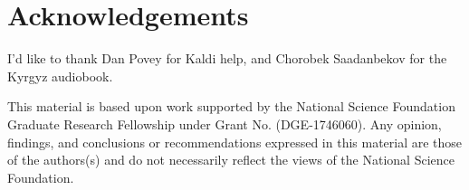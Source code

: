 \documentclass[a4paper]{article}
\begin{document}
\section{Acknowledgements}

I'd like to thank Dan Povey for Kaldi help, and Chorobek Saadanbekov for the Kyrgyz audiobook.

This material is based upon work supported by the National Science Foundation Graduate Research Fellowship under Grant No. (DGE-1746060). Any opinion, findings, and conclusions or recommendations expressed in this material are those of the authors(s) and do not necessarily reflect the views of the National Science Foundation.





\newpage



\end{document}
